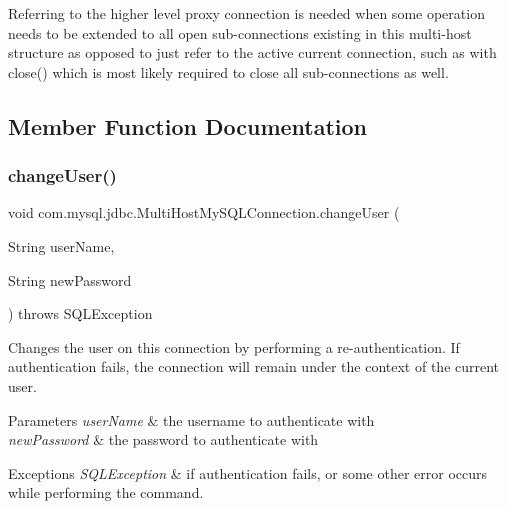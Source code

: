 Referring to the higher level proxy connection is needed when some operation needs to be extended to all open sub-\/connections existing in this multi-\/host structure as opposed to just refer to the active current connection, such as with close() which is most likely required to close all sub-\/connections as well. 

\subsection{Member Function Documentation}
\mbox{\label{classcom_1_1mysql_1_1jdbc_1_1_multi_host_my_s_q_l_connection_aae20768c54f41ae55ba08171a06b4a11}} 
\subsubsection{\texorpdfstring{change\+User()}{changeUser()}}
{\footnotesize\ttfamily void com.\+mysql.\+jdbc.\+Multi\+Host\+My\+S\+Q\+L\+Connection.\+change\+User (\begin{DoxyParamCaption}\item[{String}]{user\+Name,  }\item[{String}]{new\+Password }\end{DoxyParamCaption}) throws S\+Q\+L\+Exception}

Changes the user on this connection by performing a re-\/authentication. If authentication fails, the connection will remain under the context of the current user.


\begin{DoxyParams}{Parameters}
{\em user\+Name} & the username to authenticate with \\
\hline
{\em new\+Password} & the password to authenticate with \\
\hline
\end{DoxyParams}

\begin{DoxyExceptions}{Exceptions}
{\em S\+Q\+L\+Exception} & if authentication fails, or some other error occurs while performing the command. \\
\hline
\end{DoxyExceptions}


